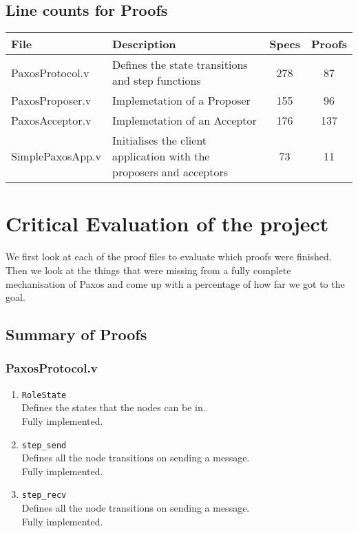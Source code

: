 \vspace{-5mm}
\subsection{Line counts for Proofs}
\begin{center}
\begin{tabular}{ |l|p{8cm}|c|c| }
\hline
File & Description & Specs & Proofs\\
\hline
PaxosProtocol.v & Defines the state transitions and step functions & 278 & 87 \\
PaxosProposer.v & Implemetation of a Proposer & 155 & 96 \\
PaxosAcceptor.v & Implemetation of an Acceptor &176 & 137 \\
SimplePaxosApp.v & Initialises the client application with the proposers and acceptors & 73 & 11 \\
\hline
\end{tabular}
\end{center}

\vspace{-5mm}
\section{Critical Evaluation of the project}
We first look at each of the proof files to evaluate which proofs
were finished. Then we look at the things that were missing from a fully
complete mechanisation of Paxos and come up with a percentage of how far we
got to the goal.

\subsection{Summary of Proofs}

\subsubsection{PaxosProtocol.v}
\begin{enumerate}
  \item \texttt{RoleState} \\
  Defines the states that the nodes can be in. \\
  Fully implemented.
  \item \texttt{step\_send} \\
  Defines all the node transitions on sending a message. \\
  Fully implemented.
  \item \texttt{step\_recv} \\
  Defines all the node transitions on sending a message. \\
  Fully implemented.
\end{enumerate}

